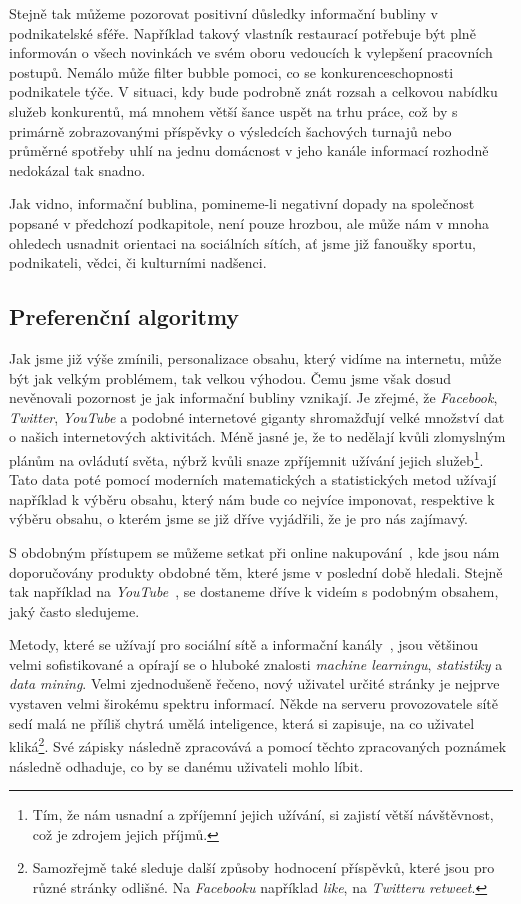 \documentclass[12pt, a4paper]{article}
\numberwithin{equation}{section} 	%
\begin{document}
Stejně tak můžeme pozorovat positivní důsledky informační bubliny v podnikatelské sféře. Například takový vlastník restaurací potřebuje být plně informován o všech novinkách ve svém oboru vedoucích k vylepšení pracovních postupů. Nemálo může filter bubble pomoci, co se konkurenceschopnosti podnikatele týče. V situaci, kdy bude podrobně znát rozsah a celkovou nabídku služeb konkurentů, má mnohem větší šance uspět na trhu práce, což by s primárně zobrazovanými příspěvky o výsledcích šachových turnajů nebo průměrné spotřeby uhlí na jednu domácnost v jeho kanále informací rozhodně nedokázal tak snadno.

Jak vidno, informační bublina, pomineme-li negativní dopady na společnost popsané v předchozí podkapitole, není pouze hrozbou, ale může nám v mnoha ohledech usnadnit orientaci na sociálních sítích, ať jsme již fanoušky sportu, podnikateli, vědci, či kulturními nadšenci.

\subsection{Preferenční algoritmy}
\noindent Jak jsme již výše zmínili, personalizace obsahu, který vidíme na internetu, může být jak velkým problémem, tak velkou výhodou. Čemu jsme však dosud nevěnovali pozornost je jak informační bubliny vznikají. Je zřejmé, že \textit{Facebook}, \textit{Twitter}, \textit{YouTube} a podobné internetové giganty shromažďují velké množství dat o našich internetových aktivitách. Méně jasné je, že to nedělají kvůli zlomyslným plánům na ovládutí světa, nýbrž kvůli snaze zpříjemnit užívání jejich služeb\footnote{Tím, že nám usnadní a zpříjemní jejich užívání, si zajistí větší návštěvnost, což je zdrojem jejich příjmů.}. Tato data poté pomocí moderních matematických a statistických metod užívají například k výběru obsahu, který nám bude co nejvíce imponovat, respektive k výběru obsahu, o kterém jsme se již dříve vyjádřili, že je pro nás zajímavý.

S obdobným přístupem se můžeme setkat při online nakupování~\cite{Amazon}, kde jsou nám doporučovány produkty obdobné těm, které jsme v poslední době hledali. Stejně tak například na \textit{YouTube}~\cite{YouTube}, se dostaneme dříve k videím s podobným obsahem, jaký často sledujeme.

Metody, které se užívají pro sociální sítě a informační kanály~\cite{TwitterRecomendation}, jsou většinou velmi sofistikované a opírají se o hluboké znalosti \textit{machine learningu}, \textit{statistiky} a \textit{data mining}. Velmi zjednodušeně řečeno, nový uživatel určité stránky je nejprve vystaven velmi širokému spektru informací. Někde na serveru provozovatele sítě sedí malá ne příliš chytrá umělá inteligence, která si zapisuje, na co uživatel kliká\footnote{Samozřejmě také sleduje další způsoby hodnocení příspěvků, které jsou pro různé stránky odlišné. Na \textit{Facebooku} například \textit{like}, na \textit{Twitteru} \textit{retweet}.}. Své zápisky následně zpracovává a pomocí těchto zpracovaných poznámek následně odhaduje, co by se danému uživateli mohlo líbit.
\end{document}
